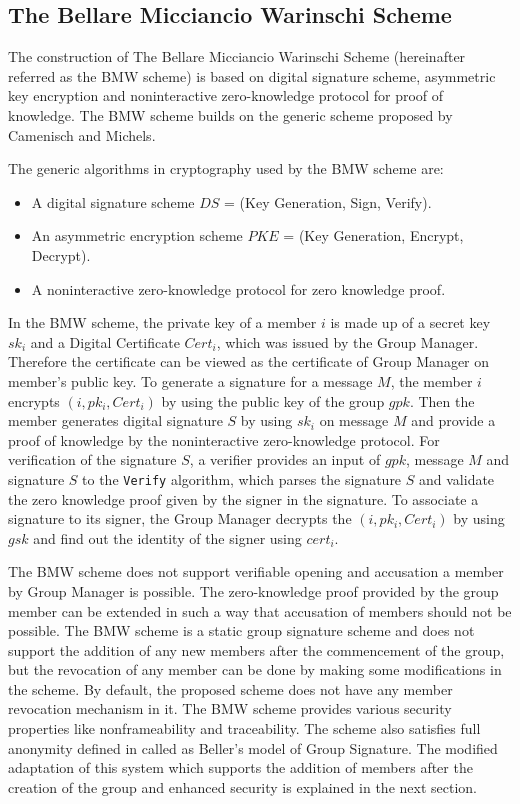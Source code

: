 \subsection{The Bellare Micciancio Warinschi Scheme}
The construction of The Bellare Micciancio Warinschi Scheme (hereinafter referred as the BMW scheme) is based on digital signature scheme, asymmetric key encryption and noninteractive zero-knowledge protocol for proof of knowledge\cite{bellare2003foundations}. The BMW scheme builds on the generic scheme proposed by Camenisch and Michels\cite{camenisch1999separability}. 

The generic algorithms in cryptography used by the BMW scheme are:
\begin{itemize}
\item A digital signature scheme $DS$ = (Key Generation, Sign, Verify).
\item An asymmetric encryption scheme $PKE$ = (Key Generation, Encrypt, Decrypt).
\item A noninteractive zero-knowledge protocol for zero knowledge proof.
\end{itemize}

In the BMW scheme, the private key of a member $i$ is made up of a secret key $sk_i$ and a Digital Certificate $Cert_i$, which was issued by the Group Manager. Therefore the certificate can be viewed as the certificate of Group Manager on member's public key. To generate a signature for a message $M$, the member $i$  encrypts $(i, pk_i, Cert_i)$ by using the public key of the group $gpk$. Then the member generates digital signature $S$ by using $sk_i$ on message $M$ and provide a proof of knowledge by the noninteractive zero-knowledge protocol. For verification of the signature $S$, a verifier provides an input of $gpk$, message $M$ and signature $S$ to the \texttt{Verify} algorithm, which parses the signature $S$ and validate the zero knowledge proof given by the signer in the signature. To associate a signature to its signer, the Group Manager decrypts the $(i, pk_i, Cert_i)$ by using $gsk$ and find out the identity of the signer using $cert_i$. 

The BMW scheme does not support verifiable opening and accusation a member by Group Manager is possible. The zero-knowledge proof provided by the group member can be extended in such a way that accusation of members should not be possible. The BMW scheme is a static group signature scheme and does not support the addition of any new members after the commencement of the group, but the revocation of any member can be done by making some modifications in the scheme. By default, the proposed scheme does not have any member revocation mechanism in it. The BMW scheme provides various security properties like nonframeability and traceability. The scheme also satisfies full anonymity defined in \cite{bellare2003foundations} called as Beller's model of Group Signature. The modified adaptation of this system which supports the addition of members after the creation of the group and enhanced security is explained in the next section.

